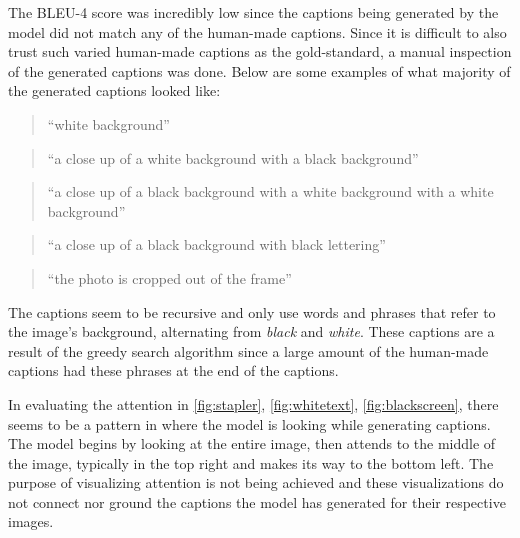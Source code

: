 \documentclass[11pt,a4paper]{article}
\begin{document}
The BLEU-4 score was incredibly low since the captions being generated by the model did not match any of the human-made captions. Since it is difficult to also trust such varied human-made captions as the gold-standard, a manual inspection of the generated captions was done. Below are some examples of what majority of the generated captions looked like:
\begin{quote}
  ``white background''
\end{quote}
\begin{quote}
  ``a close up of a white background with a black background''
\end{quote}
\begin{quote}
  ``a close up of a black background with a white background with a white background''
\end{quote}
\begin{quote}
  ``a close up of a black background with black lettering''
\end{quote}
\begin{quote}
  ``the photo is cropped out of the frame''
\end{quote}

The captions seem to be recursive and only use words and phrases that refer to the image’s background, alternating from \emph{black} and \emph{white}. These captions are a result of the greedy search algorithm since a large amount of the human-made captions had these phrases at the end of the captions.
	
In evaluating the attention in \autoref{fig:stapler}, \autoref{fig:whitetext}, \autoref{fig:blackscreen}, there seems to be a pattern in where the model is looking while generating captions. The model begins by looking at the entire image, then attends to the middle of the image, typically in the top right and makes its way to the bottom left. The purpose of visualizing attention is not being achieved and these visualizations do not connect nor ground the captions the model has generated for their respective images. 
\end{document}
